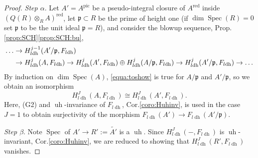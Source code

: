 \documentclass[10pt]{amsart}
\theoremstyle{definition}
\newcommand{\p}{\mathfrak{p}}
\DeclareMathOperator{\Spec}{Spec}
\newcommand{\ldh}{{l{\operatorname{dh}}}}
\newcommand{\uh}{\operatorname{uh}}
\newcommand{\red}{{\operatorname{red}}}
\newcommand{\pic}{{\operatorname{pic}}}
\begin{document}
\begin{proof}
\emph{Step $\alpha$}. Let $A' = A^\pic$ be a pseudo-integral closure of $A^\red$ inside $(Q(R) \otimes_R A)^\red$, let $\p \subset R$ be the prime of height one (if $\dim \Spec(R) = 0$ set $\p$ to be the unit ideal $\p = R$), and consider the blowup sequence, Prop.\ref{prop:SCH}\eqref{prop:SCH:bu},
\begin{align} \label{eq:bup}
\dots 
&\to H_\ldh^{j-1}(A' / \p, F_\ldh)
\\&\to H_\ldh^j(A, F_\ldh) 
\to H_\ldh^j(A', F_\ldh) \oplus H_\ldh^j(A / \p, F_\ldh)
\to H_\ldh^j(A' / \p, F_\ldh)
\to \dots \notag
\end{align}
By induction on $\dim \Spec(A)$, \eqref{equa:toshow} is true for $A / \p$ and $A' / \p$, so we obtain an isomorphism 
\begin{equation} \label{equa:ldhAAbreve}
H_\ldh^J(A, F_\ldh) \cong H_\ldh^J(A', F_\ldh).
\end{equation}
Here, (G2) and $\uh$-invariance of $F_\ldh$, Cor.\ref{coro:Huhinv}, is used in the case $J = 1$ to obtain surjectivity of the morphism $F_\ldh(A') \to F_\ldh(A' / \p)$.

\emph{Step $\beta$}. Note $\Spec$ of $A' \to R' := \widetilde{A'}$ is a $\uh$. Since $H_\ldh^J(-, F_\ldh)$ is $\uh$-invariant, Cor.\ref{coro:Huhinv}, we are reduced to showing that 
$H_\ldh^J(R', F_\ldh)$ %
vanishes.%


\end{proof}
\end{document}
